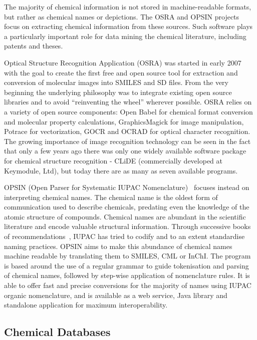 \documentclass[10pt]{bmc_article}
\newenvironment{bmcformat}{\fussy\setboolean{publ}{true}}{\fussy}
\begin{document}
\begin{bmcformat}
The majority of chemical information is not stored in machine-readable
formats, but rather as chemical names or depictions. The OSRA and OPSIN
projects focus on extracting chemical information from these sources.
Such software plays a particularly important role for data mining the
chemical literature, including patents and theses.

Optical Structure Recognition Application (OSRA) \cite{WebOSRA} was started
in early 2007 with the goal to create the first free and open source
tool for extraction and conversion of molecular images into SMILES and
SD files. From the very beginning the underlying philosophy was to integrate
existing open source libraries and to avoid ``reinventing the wheel''
wherever possible. OSRA relies on a variety of open source components:
Open Babel for chemical format
conversion and molecular property calculations, GraphicsMagick for image
manipulation, Potrace for vectorization, GOCR and OCRAD for optical
character recognition. The growing importance of image
recognition technology can be seen in the fact that
only a few years ago there was only one widely available software
package for chemical structure recognition -  CLiDE (commercially
developed at Keymodule, Ltd), but today there are as many as seven
available programs.

OPSIN (Open Parser for Systematic IUPAC
Nomenclature)~\cite{lowe_chemical_2011} focuses instead on interpreting chemical names.
The chemical name is the oldest form of communication used to
describe chemicals, predating
even the knowledge of the atomic structure of compounds.
Chemical names are abundant in the scientific
literature and encode valuable structural information.
Through successive books of
recommendations~\cite{iupac_nomenclature_1979, iupac_guide_1993},
IUPAC has tried to codify and to an extent standardise naming practices.
OPSIN aims to make this abundance of
chemical names machine readable by translating them to SMILES, CML or
InChI. The program is based around the use of a regular grammar to
guide tokenisation and parsing of chemical names, followed by
step-wise application of nomenclature rules. It is able to offer
fast and precise conversions for the majority of names using IUPAC
organic nomenclature, and is available as a web service, Java
library and standalone application for maximum interoperability.

\subsection*{Chemical Databases}


\end{bmcformat}
\end{document}
